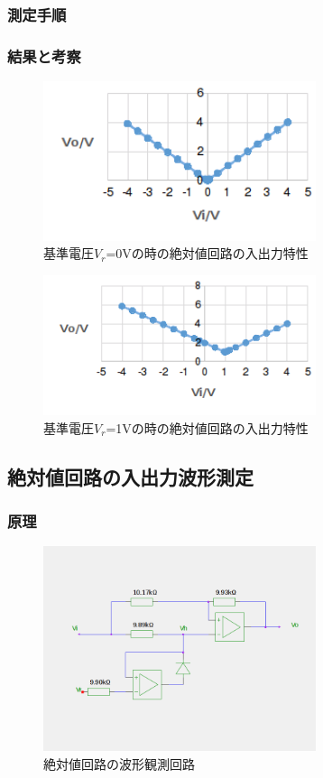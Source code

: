 \documentclass[11pt,a4j]{jsarticle}
\begin{document}
   \subsubsection{測定手順}
    
    
   \subsubsection{結果と考察}
    
    \begin{figure}[htbp]
  \centering
  \includegraphics[width=8cm,clip]{2_Vr0.png}
  \caption{基準電圧$V_r$=0Vの時の絶対値回路の入出力特性}
  \label{fig:2_Vr0}
 \end{figure}%
    
    \begin{figure}[htbp]
  \centering
  \includegraphics[width=8cm,clip]{2_Vr1.png}
  \caption{基準電圧$V_r$=1Vの時の絶対値回路の入出力特性}
  \label{fig:2_Vr1}
 \end{figure}%
    
    
    
  \subsection{絶対値回路の入出力波形測定}
   \subsubsection{原理}
    
    \begin{figure}[htbp]
  \centering
  \includegraphics[width=8cm,clip]{abs_wave.png}
  \caption{絶対値回路の波形観測回路}
  \label{fig:abs_wave}
 \end{figure}%
    
\end{document}
